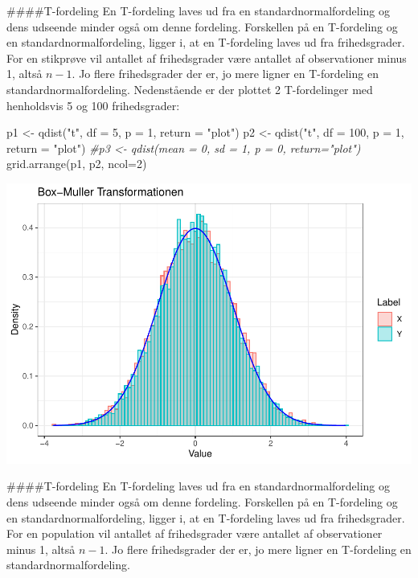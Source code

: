 \documentclass[
]{article}
\newenvironment{Shaded}{\begin{snugshade}}{\end{snugshade}}
\newcommand{\AttributeTok}[1]{\textcolor[rgb]{0.77,0.63,0.00}{#1}}
\newcommand{\CommentTok}[1]{\textcolor[rgb]{0.56,0.35,0.01}{\textit{#1}}}
\newcommand{\DecValTok}[1]{\textcolor[rgb]{0.00,0.00,0.81}{#1}}
\newcommand{\FunctionTok}[1]{\textcolor[rgb]{0.00,0.00,0.00}{#1}}
\newcommand{\NormalTok}[1]{#1}
\newcommand{\OtherTok}[1]{\textcolor[rgb]{0.56,0.35,0.01}{#1}}
\newcommand{\StringTok}[1]{\textcolor[rgb]{0.31,0.60,0.02}{#1}}
\begin{document}
\#\#\#\#T-fordeling En T-fordeling laves ud fra en
standardnormalfordeling og dens udseende minder også om denne fordeling.
Forskellen på en T-fordeling og en standardnormalfordeling, ligger i, at
en T-fordeling laves ud fra frihedsgrader. For en stikprøve vil antallet
af frihedsgrader være antallet af observationer minus 1, altså \(n-1\).
Jo flere frihedsgrader der er, jo mere ligner en T-fordeling en
standardnormalfordeling. Nedenstående er der plottet 2 T-fordelinger med
henholdsvis 5 og 100 frihedsgrader:

\begin{Shaded}
\begin{Highlighting}[]
\NormalTok{p1 }\OtherTok{\textless{}{-}} \FunctionTok{qdist}\NormalTok{(}\StringTok{"t"}\NormalTok{, }\AttributeTok{df =} \DecValTok{5}\NormalTok{, }\AttributeTok{p =} \DecValTok{1}\NormalTok{, }\AttributeTok{return =} \StringTok{"plot"}\NormalTok{)}
\NormalTok{p2 }\OtherTok{\textless{}{-}} \FunctionTok{qdist}\NormalTok{(}\StringTok{"t"}\NormalTok{, }\AttributeTok{df =} \DecValTok{100}\NormalTok{, }\AttributeTok{p =} \DecValTok{1}\NormalTok{, }\AttributeTok{return =} \StringTok{"plot"}\NormalTok{)}
\CommentTok{\#p3 \textless{}{-} qdist(mean = 0, sd = 1, p = 0, return="plot")}
\FunctionTok{grid.arrange}\NormalTok{(p1, p2, }\AttributeTok{ncol=}\DecValTok{2}\NormalTok{)}
\end{Highlighting}
\end{Shaded}

\includegraphics{TP2_files/figure-latex/unnamed-chunk-8-1.pdf}

\#\#\#\#T-fordeling En T-fordeling laves ud fra en
standardnormalfordeling og dens udseende minder også om denne fordeling.
Forskellen på en T-fordeling og en standardnormalfordeling, ligger i, at
en T-fordeling laves ud fra frihedsgrader. For en population vil
antallet af frihedsgrader være antallet af observationer minus 1, altså
\(n-1\). Jo flere frihedsgrader der er, jo mere ligner en T-fordeling en
standardnormalfordeling.
\end{document}
